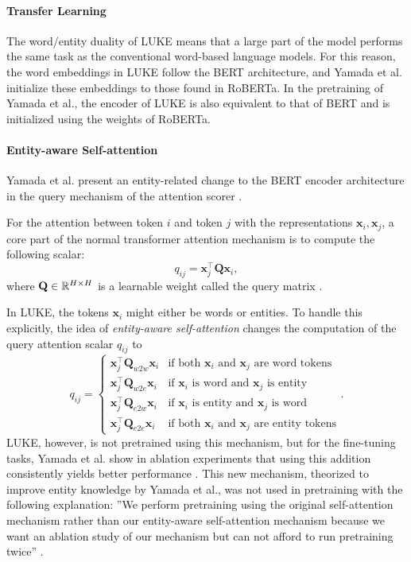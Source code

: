\documentclass[main.tex]{subfiles}
\begin{document}
\paragraph{Transfer Learning}
The word/entity duality of LUKE means that a large part of the model performs the same task as the conventional word-based language models.
For this reason, the word embeddings in LUKE follow the BERT architecture, and Yamada et al. initialize these embeddings to those found in RoBERTa.
In the pretraining of Yamada et al., the encoder of LUKE is also equivalent to that of BERT and is initialized using the weights of RoBERTa.


\paragraph{Entity-aware Self-attention}
\label{subsubsec:entityaware}
Yamada et al. present an entity-related change to the BERT encoder architecture in the query mechanism of the attention scorer \cite[Sec. 3.2]{yamada2020luke}.

For the attention between token $i$ and token $j$ with the representations $\mathbf x_i, \mathbf x_j$, a core part of the normal transformer attention mechanism is to compute the following scalar:
\begin{equation}
    q_{ij} = \mathbf x_j^\top \mathbf Q \mathbf x_i,
\end{equation}
where $\mathbf Q\in \mathbb R^{H\times H}$ is a learnable weight called the query matrix \cite[Sec. 3.2.1]{vaswani2017att}.

In LUKE, the tokens $\mathbf x_i$ might either be words or entities.
To handle this explicitly, the idea of \emph{entity-aware self-attention} changes the computation of the query attention scalar $q_{ij}$ to
\begin{equation}
    q_{ij} = 
    \begin{cases}
    \mathbf x_j^\top \mathbf Q_{w2w} \mathbf x_i  & \text{if both $\mathbf x_i$ and $\mathbf x_j$ are word tokens}\\
    \mathbf x_j^\top \mathbf Q_{w2e} \mathbf x_i & \text{if $\mathbf x_i$ is word and $\mathbf x_j$ is entity}\\
    \mathbf x_j^\top \mathbf Q_{e2w} \mathbf x_i & \text{if $\mathbf x_i$ is entity and $\mathbf x_j$ is word}\\
    \mathbf x_j^\top \mathbf Q_{e2e} \mathbf x_i & \text{if both $\mathbf x_i$ and $\mathbf x_j$ are entity tokens}
    \end{cases}.
\end{equation}
LUKE, however, is not pretrained using this mechanism, but for the fine-tuning tasks, Yamada et al. show in ablation experiments that using this addition consistently yields better performance \cite[Sec. 5.2]{yamada2020luke}.
This new mechanism, theorized to improve entity knowledge by Yamada et al., was  not used in pretraining with the following explanation:
''We perform pretraining using the original self-attention mechanism rather than our entity-aware self-attention mechanism because we want an ablation study of our mechanism but can not afford to run pretraining twice'' \cite[Sec. 3.4]{yamada2020luke}.
\end{document}
